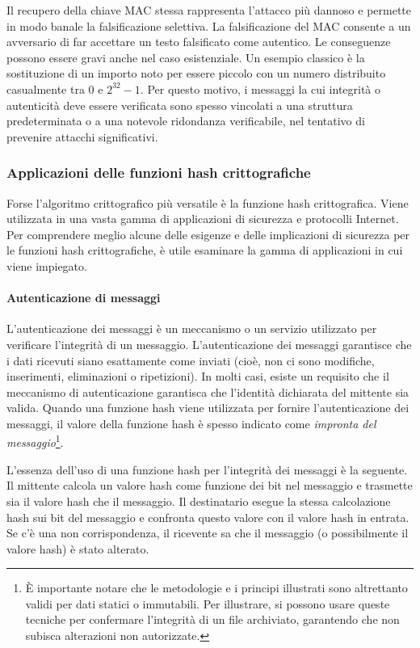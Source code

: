 \documentclass{article}
\theoremstyle{definition}
\begin{document}
Il recupero della chiave MAC stessa rappresenta l'attacco più dannoso e permette in modo banale la falsificazione selettiva. La falsificazione del MAC consente a un avversario di far accettare un testo falsificato come autentico. Le conseguenze possono essere gravi anche nel caso esistenziale. Un esempio classico è la sostituzione di un importo noto per essere piccolo con un numero distribuito casualmente tra 0 e \(2^{32} - 1\). Per questo motivo, i messaggi la cui integrità o autenticità deve essere verificata sono spesso vincolati a una struttura predeterminata o a una notevole ridondanza verificabile, nel tentativo di prevenire attacchi significativi.
\subsubsection{Applicazioni delle funzioni hash crittografiche}
Forse l'algoritmo crittografico più versatile è la funzione hash crittografica. Viene utilizzata in una vasta gamma di applicazioni di sicurezza e protocolli Internet.
Per comprendere meglio alcune delle esigenze e delle implicazioni di sicurezza per le funzioni hash crittografiche, è utile esaminare la gamma di applicazioni in cui viene impiegato.

\paragraph{Autenticazione di messaggi}
L'autenticazione dei messaggi è un meccanismo o un servizio utilizzato per verificare l'integrità di un messaggio. L'autenticazione dei messaggi garantisce che i dati ricevuti siano esattamente come inviati (cioè, non ci sono modifiche, inserimenti, eliminazioni o ripetizioni). In molti casi, esiste un requisito che il meccanismo di autenticazione garantisca che l'identità dichiarata del mittente sia valida. Quando una funzione hash viene utilizzata per fornire l'autenticazione dei messaggi, il valore della funzione hash è spesso indicato come \textit{impronta del messaggio}\footnote{È importante notare che le metodologie e i principi illustrati sono altrettanto validi per dati statici o immutabili. Per illustrare, si possono usare queste tecniche per confermare l'integrità di un file archiviato, garantendo che non subisca alterazioni non autorizzate.
}.

L'essenza dell'uso di una funzione hash per l'integrità dei messaggi è la seguente. Il mittente calcola un valore hash come funzione dei bit nel messaggio e trasmette sia il valore hash che il messaggio. Il destinatario esegue la stessa calcolazione hash sui bit del messaggio e confronta questo valore con il valore hash in entrata. Se c'è una non corrispondenza, il ricevente sa che il messaggio (o possibilmente il valore hash) è stato alterato.
\end{document}

